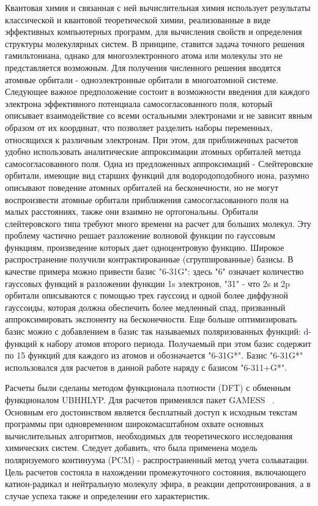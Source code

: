 \documentclass[14pt,titlepage]{extarticle}
\begin{document}
Квантовая химия и связанная с ней вычислительная химия использует результаты классической и квантовой теоретической химии, реализованные в виде эффективных компьютерных программ, для вычисления свойств и определения структуры молекулярных систем. В принципе, ставится задача точного решения гамильтониана, однако для многоэлектронного атома или молекулы это не представляется возможным. Для получения численного решения вводятся атомные орбитали - одноэлектронные орбитали в многоатомной системе. Следующее важное предположение состоит в возможности введения для каждого электрона эффективного потенциала самосогласованного поля, который описывает взаимодействие со всеми остальными электронами и не зависит явным образом от их координат, что позволяет разделить наборы переменных, относящихся к различным электронам. При этом, для приближенных расчетов удобно использовать аналитические аппроксимации атомных орбиталей метода самосогласованного поля. Одна из предложенных аппроксимаций - Слейтеровские орбитали, имеющие вид старших функций для водородоподобного иона, разумно описывают поведение атомных орбиталей на бесконечности, но не могут воспроизвести атомные орбитали приближения самосогласованного поля на малых расстояниях, также они взаимно не ортогональны. Орбитали слейтеровского типа требуют много времени на расчет для больших молекул. Эту проблему частично решает разложение волновой функции по гауссовым функциям, произведение которых дает одноцентровую функцию. Широкое распространение получили контрактированные (сгруппированные) базисы. В качестве примера можно привести базис "6-31G": здесь "6" означает количество гауссовых функций в разложении функции 1s электронов, "31" - что 2s и 2p орбитали описываются с помощью трех гауссоид и одной более диффузной гауссоиды, которая должна обеспечить более медленный спад, призванный аппроксимировать экспоненту на бесконечности. Еще больше оптимизировать базис можно с добавлением в базис так называемых поляризованных функций: d-функций к набору атомов второго периода. Получаемый при этом базис содержит по 15 функций для каждого из атомов и обозначается "6-31G*". Базис "6-31G*" использовался для расчетов в данной работе наряду с базисом "6-311+G*".

Расчеты были сделаны методом функционала плотности (DFT) с обменным функционалом UBHHLYP. Для расчетов применялся пакет GAMESS	~\cite{gamess}. Основным его достоинством является бесплатный доступ к исходным текстам программы при одновременном широкомасштабном охвате основных вычислительных алгоритмов, необходимых для теоретического исследования химических систем. Следует добавить, что была применена модель поляризуемого континуума (PCM) - распространенный метод учета сольватации. Цель расчетов состояла в нахождении промежуточного состояния, включающего катион-радикал и нейтральную молекулу эфира, в реакции депротонирования, а в случае успеха также и определении его характеристик. 
\end{document}
